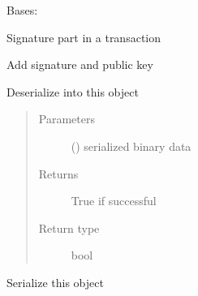 \documentclass[letterpaper,10pt,english]{sphinxmanual}
\begin{document}

\begin{fulllineitems}
\label{\detokenize{bbc1.core.bbclib:bbc1.core.bbclib.BBcSignature}}
Bases: 

Signature part in a transaction

\begin{fulllineitems}
\label{\detokenize{bbc1.core.bbclib:bbc1.core.bbclib.BBcSignature.add}}
Add signature and public key

\end{fulllineitems}


\begin{fulllineitems}
\label{\detokenize{bbc1.core.bbclib:bbc1.core.bbclib.BBcSignature.deserialize}}
Deserialize into this object
\begin{quote}\begin{description}
\item[{Parameters}] \leavevmode
{} () \textendash{} serialized binary data

\item[{Returns}] \leavevmode
True if successful

\item[{Return type}] \leavevmode
bool

\end{description}\end{quote}

\end{fulllineitems}


\begin{fulllineitems}
\label{\detokenize{bbc1.core.bbclib:bbc1.core.bbclib.BBcSignature.serialize}}
Serialize this object


\end{fulllineitems}
\end{fulllineitems}
\end{document}
